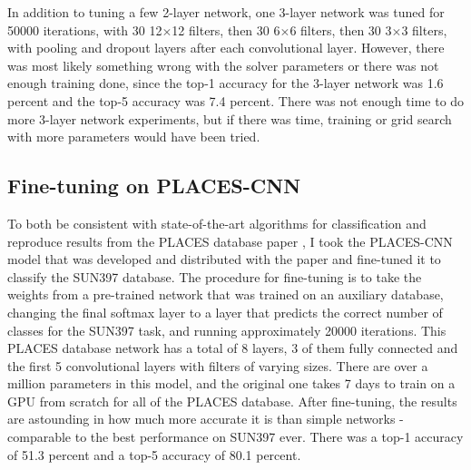 \documentclass[10pt]{article}
\begin{document}
\begin{table}[!ht]
\centering
{}
\caption{Summary of best top-1 and top-5 accuracy results on two-layer networks}
\label{tbl:twolayer}
\end{table}

In addition to tuning a few 2-layer network, one 3-layer network was tuned for 50000 iterations, with 30 12$\times$12 filters, then 30 6$\times$6 filters, then 30 3$\times$3 filters, with pooling and dropout layers after each convolutional layer. However, there was most likely something wrong with the solver parameters or there was not enough training done, since the top-1 accuracy for the 3-layer network was 1.6 percent and the top-5 accuracy was 7.4 percent. There was not enough time to do more 3-layer network experiments, but if there was time, training or grid search with more parameters would have been tried.

\subsection{Fine-tuning on PLACES-CNN}
\label{sec:places}

To both be consistent with state-of-the-art algorithms for classification and reproduce results from the PLACES database paper \cite{zhou_learning_2014}, I took the PLACES-CNN model that was developed and distributed with the paper and fine-tuned it to classify the SUN397 database. The procedure for fine-tuning is to take the weights from a pre-trained network that was trained on an auxiliary database, changing the final softmax layer to a layer that predicts the correct number of classes for the SUN397 task, and running approximately 20000 iterations. This PLACES database network has a total of 8 layers, 3 of them fully connected and the first 5 convolutional layers with filters of varying sizes. There are over a million parameters in this model, and the original one takes 7 days to train on a GPU from scratch for all of the PLACES database. After fine-tuning, the results are astounding in how much more accurate it is than simple networks - comparable to the best performance on SUN397 ever. There was a top-1 accuracy of 51.3 percent and a top-5 accuracy of 80.1 percent.
\end{document}
